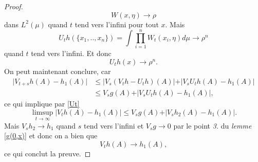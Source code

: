 \documentclass[a4paper,11pt]{article}
\theoremstyle{break}
\theoremstyle{break}
\theoremstyle{definition}
\theoremstyle{remark}
\begin{document}
\begin{proof}
$$
W(x,\eta)\rightarrow \rho
$$
dans $L^2 (\mu )$ quand $t$ tend vers l'infini pour tout $x$. Mais
$$
U_t h(\{ x_1,..,x_n\}) = \int \prod_{i=1}^n W_t (x_i ,\eta ) d \mu \rightarrow \rho^n
$$
quand $t$ tend vers l'infini. Et donc 
\begin{equation}\label{Ut}
U_t h (x) \rightarrow\rho^n.
\end{equation}
On peut maintenant conclure, car 
\begin{align*}
\vert V_{t+s} h(A) -h_1 (A) \vert &\leq \vert V_s (V_t h - U_t h)(A)\vert +\vert V_s U_t h(A)- h_1 (A)\vert\\
&\leq V_s g(A) + \vert V_s U_t h (A) -h_1 (A)\vert,
\end{align*}
ce qui implique par \eqref{Ut}
$$
\limsup_{t\rightarrow\infty} \vert V_t h(A) - h_1 (A) \vert\leq V_s g(A) + \vert V_s h_2 (A) -h_1 (A)\vert.
$$
Mais $V_sh_2\rightarrow h_1$ quand $s$ tend vers l'infini et $V_sg\rightarrow 0$ par le point \textit{3.} du \textit{lemme} \ref{g(0,x)} et donc on a bien que
$$
V_t h(A)\rightarrow h_1(A),
$$
ce qui conclut la preuve.
\end{proof}



















\end{document}
